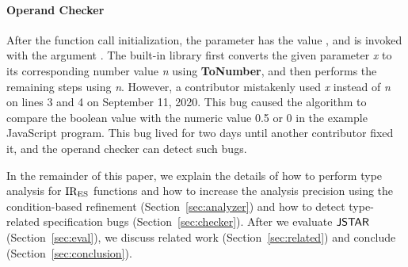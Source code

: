 \paragraph{Operand Checker} After the function call initialization, the
parameter  has the value , and  is invoked
with the argument .  The  built-in library first
converts the given parameter \textit{x} to its corresponding number value
\textit{n} using \textbf{ToNumber}, and then performs the remaining
steps using \textit{n}.  However, a contributor mistakenly used
\textit{x} instead of \textit{n} on lines 3 and 4 on September 11, 2020.
This bug caused the algorithm to compare the boolean value  with the
numeric value 0.5 or 0 in the example JavaScript program.
This bug lived for two days until another contributor fixed it, and
the operand checker can detect such bugs.

In the remainder of this paper, we explain the details of how to perform type
analysis for ${\text{IR}_\text{ES}}$ functions and how to increase the analysis precision using
the condition-based refinement (Section~\ref{sec:analyzer}) and how to detect
type-related specification bugs (Section~\ref{sec:checker}).  After we evaluate $\tool$
(Section~\ref{sec:eval}), we discuss related work (Section~\ref{sec:related})
and conclude (Section~\ref{sec:conclusion}).
